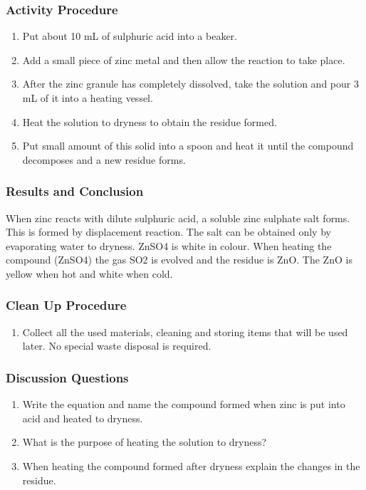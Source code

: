 \subsubsection*{Activity Procedure}
\begin{enumerate}
\item{Put about 10 mL of sulphuric acid into a beaker.}
\item{Add a small piece of zinc metal and then allow the reaction to take place.}
\item{After the zinc granule has completely dissolved, take the solution and pour 3 mL of it into a heating vessel.}
\item{Heat the solution to dryness to obtain the residue formed.}
\item{Put small amount of this solid into a spoon and heat it until the compound decomposes and a new residue forms.}
\end{enumerate}

\subsubsection*{Results and Conclusion}
When zinc reacts with dilute sulphuric acid, a soluble zinc sulphate salt forms. This is formed by displacement reaction. The salt can be obtained only by evaporating water to dryness. ZnSO4 is white in colour. When heating the compound (ZnSO4) the gas SO2 is evolved and the residue is ZnO. The ZnO is yellow when hot and white when cold.

\subsubsection*{Clean Up Procedure}
\begin{enumerate}
\item{Collect all the used materials, cleaning and storing items that will be used later. No special waste disposal is required.}
\end{enumerate}

\subsubsection*{Discussion Questions}
\begin{enumerate}
\item{Write the equation and name the compound formed when zinc is put into acid and heated to dryness.}
\item{What is the purpose of heating the solution to dryness?}
\item{When heating the compound formed after dryness explain the changes in the residue.}
\end{enumerate}

